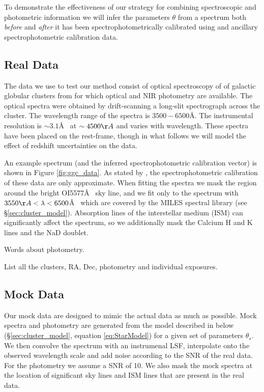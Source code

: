 \documentclass[iop,numberedappendix]{emulateapj}
\begin{document}
To demonstrate the effectiveness of our strategy for combining
spectroscopic and photometric information we will infer the parameters
$\theta$ from a spectrum both \emph{before} and \emph{after} it has
been spectrophotometrically calibrated using and ancillary
spectrophotometric calibration data.


\subsection{Real Data}

The data we use to test our method consist of optical spectroscopy of
of galactic globular clusters from \citet{schiavon05} for which
optical and NIR photometry are available. The optical spectra were
obtained by drift-scanning a long-slit spectrograph across the
cluster.  The wavelength range of the spectra is $3500-6500$\AA. The
instrumental resolution is $\sim 3.1$\AA~ at $\sim 4500\AA$ and varies
with wavelength.  These spectra have been placed on the rest-frame,
though in what follows we will model the effect of redshift
uncertainties on the data.

An example spectrum (and the inferred spectrophotometric calibration
vector) is shown in Figure \ref{fig:ggc_data}.  As stated by
\citet{schiavon05}, the spectrophotometric calibration of these data
are only approximate.  When fitting the spectra we mask the region
around the bright OI5577\AA~ sky line, and we fit only to the spectrum
with $3550\AA < \lambda < 6500$\AA~ which are covered by the MILES
spectral library (see \S\ref{sec:cluster_model}).  Absorption lines of
the interstellar medium (ISM) can significantly affect the spectrum,
so we additionally mask the Calcium H and K lines and the NaD doublet.

Words about photometry.

\begin{table}[h!]
\caption{List all the clusters, RA, Dec, photometry and individual exposures.}
\end{table}


\subsection{Mock Data}
Our mock data are designed to mimic the actual data as much as
possible.  Mock spectra and photometry are generated from the model
described in below (\S\ref{sec:cluster_model}, equation
\ref{eq:StarModel}) for a given set of parameters $\theta_s$.  We then
convolve the spectrum with an instrumenal LSF, interpolate onto the
observed wavelength scale and add noise according to the SNR of the
real data.  For the photometry we assume a SNR of 10.  We also mask
the mock spectra at the location of significant sky lines and ISM
lines that are present in the real data.
\end{document}
